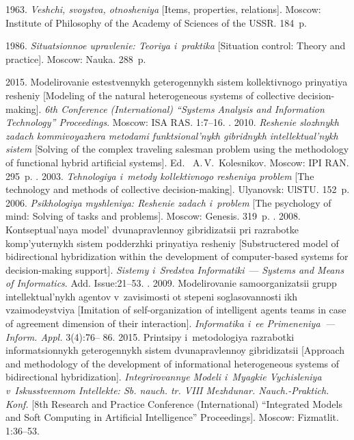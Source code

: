 \begin{multicols}{2}
{{\begin{thebibliography}{99}
 1963. \textit{Veshchi, svoystva, otnosheniya} [Items, properties, relations]. 
Moscow: Institute of Philosophy of the Academy of Sciences of the USSR. 184~p.

 1986. \textit{Situatsionnoe upravlenie: Teoriya i~praktika} [Situation 
control: Theory and practice]. Moscow: Nauka. 288~p.

 2015. Modelirovanie estestvennykh geterogennykh sistem kollektivnogo 
prinyatiya resheniy [Modeling of the natural heterogeneous systems of collective decision-making]. 
\textit{6th Conference (International) ``Systems Analysis and Information Technology'' 
Proceedings}. 
Moscow: ISA RAS. 1:7--16.
. 2010. 
\textit{Reshenie slozhnykh zadach kommivoyazhera metodami funktsional'nykh gibridnykh 
intellektual'nykh sistem} [Solving of the complex traveling salesman problem using the 
methodology of functional hybrid artificial systems]. Ed.~ A.\,V.~Kolesnikov. Moscow: IPI RAN. 295~p.
. 2003. \textit{Tehnologiya i~metody kollektivnogo 
resheniya problem} [The technology and methods of collective  
decision-making]. Ulyanovsk: UlSTU. 152~p.
 2006. \textit{Psikhologiya myshleniya: Reshenie zadach i~problem} 
[The psychology of mind: Solving of tasks and problems]. Moscow: 
Genesis. 319~p.
. 2008. Kontseptual'naya model' dvunapravlennoy 
gibridizatsii pri razrabotke komp'yuternykh sistem podderzhki prinyatiya resheniy [Substructered 
model of bidirectional hybridization within the development of computer-based systems for 
decision-making support]. \textit{Sistemy i~Sredstva Informatiki}~--- \textit{Systems and Means of 
Informatics}. Add. Issue:21--53.
. 2009. Modelirovanie 
samoorganizatsii grupp intellektual'nykh agentov v~zavisimosti ot stepeni soglasovannosti ikh 
vzaimodeystviya [Imitation of self-organization of intelligent agents teams 
in case of agreement 
dimension of their interaction]. \textit{Informatika i~ee Primeneniya~--- Inform. Appl.}  
3(4):76-- 86.
 2015. Printsipy i~metodologiya razra\-botki informatsionnykh 
geterogennykh sistem dvu\-na\-pravlennoy gibridizatsii [Approach and methodology of the 
development of informational heterogeneous systems of %
 bidirectional hybridization]. 
\textit{Integrirovannye Modeli i~Myagkie Vychisleniya v~Iskusstvennom Intellekte: Sb. 
nauch. tr. 
\mbox{VIII} Mezhdunar. Nauch.-Praktich. Konf.} [8th Research and Practice Conference (International) 
``Integrated Models and Soft Computing in Artificial Intelligence'' Proceedings]. 
Moscow: 
Fizmatlit. 1:36--53.



\end{thebibliography}}}
\end{multicols}
